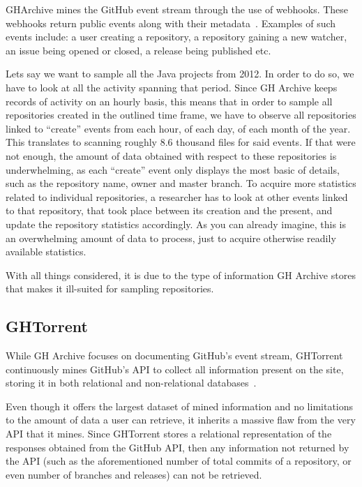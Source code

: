 GHArchive mines the GitHub event stream through the use of webhooks.
These webhooks return public events along with their metadata~\cite{APIWEBHOOKS}.
Examples of such events include: a user creating a repository, a repository gaining a new watcher, an issue being opened or closed, a release being published etc.

Lets say we want to sample all the Java projects from 2012.
In order to do so, we have to look at all the activity spanning that period.
Since GH Archive keeps records of activity on an hourly basis, this means that in order to sample all repositories created in the outlined time frame, we have to observe all repositories linked to ``create'' events from each hour, of each day, of each month of the year.
This translates to scanning roughly 8.6 thousand files for said events.
If that were not enough, the amount of data obtained with respect to these repositories is underwhelming, as each ``create'' event only displays the most basic of details, such as the repository name, owner and master branch.
To acquire more statistics related to individual repositories, a researcher has to look at other events linked to that repository, that took place between its creation and the present, and update the repository statistics accordingly.
As you can already imagine, this is an overwhelming amount of data to process, just to acquire otherwise readily available statistics.

With all things considered, it is due to the type of information GH Archive stores that makes it ill-suited for sampling repositories.

\subsection{GHTorrent}

While GH Archive focuses on documenting GitHub's event stream, GHTorrent continuously mines GitHub's API to collect all information present on the site, storing it in both relational and non-relational databases~\cite{G13}.

Even though it offers the largest dataset of mined information and no limitations to the amount of data a user can retrieve, it inherits a massive flaw from the very API that it mines.
Since GHTorrent stores a relational representation of the responses obtained from the GitHub API, then any information not returned by the API (such as the aforementioned number of total commits of a repository, or even number of branches and releases) can not be retrieved.

